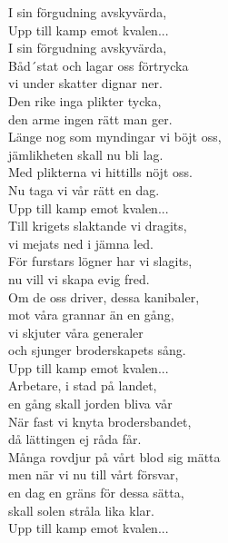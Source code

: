\vspace{10pt}
I sin förgudning avskyvärda,\\
Upp till kamp emot kvalen...\\
\vspace{10pt}
I sin förgudning avskyvärda,\\
Båd´stat och lagar oss förtrycka\\
vi under skatter dignar ner.\\
Den rike inga plikter tycka,\\
den arme ingen rätt man ger.\\
Länge nog som myndingar vi böjt oss,\\
jämlikheten skall nu bli lag.\\
Med plikterna vi hittills nöjt oss.\\
Nu taga vi vår rätt en dag.\\
\vspace{10pt}
Upp till kamp emot kvalen...\\
\vspace{10pt}
Till krigets slaktande vi dragits,\\
vi mejats ned i jämna led.\\
För furstars lögner har vi slagits,\\
nu vill vi skapa evig fred.\\
Om de oss driver, dessa kanibaler,\\
mot våra grannar än en gång,\\
vi skjuter våra generaler\\
och sjunger broderskapets sång.\\
\vspace{10pt}
Upp till kamp emot kvalen...\\
\vspace{10pt}
Arbetare, i stad på landet,\\
en gång skall jorden bliva vår\\
När fast vi knyta brodersbandet,\\
då lättingen ej råda får.\\
Många rovdjur på vårt blod sig mätta\\
men när vi nu till vårt försvar,\\
en dag en gräns för dessa sätta,\\
skall solen stråla lika klar.\\
\vspace{10pt}
Upp till kamp emot kvalen...
